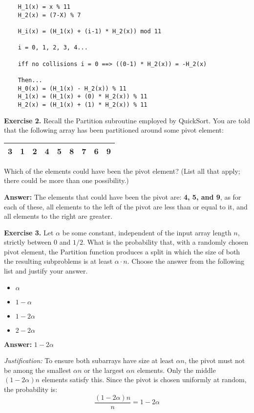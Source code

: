 \documentclass[11pt]{article}
\begin{document}
\bigskip
\begin{verbatim}
    H_1(x) = x % 11
    H_2(x) = (7-X) % 7
    
    H_i(x) = (H_1(x) + (i-1) * H_2(x)) mod 11
    
    i = 0, 1, 2, 3, 4... 
    
    iff no collisions i = 0 ==> ((0-1) * H_2(x)) = -H_2(x)
    
    Then... 
    H_0(x) = (H_1(x) - H_2(x)) % 11
    H_1(x) = (H_1(x) + (0) * H_2(x)) % 11
    H_2(x) = (H_1(x) + (1) * H_2(x)) % 11
\end{verbatim}





\textbf{Exercise 2.}  Recall the \textsf{Partition} subroutine employed by \textsf{QuickSort}. You are told that the following array has been partitioned around some pivot element:
\medskip

\begin{tabular}{|c|c|c|c|c|c|c|c|c|}
\hline 
3 & 1& 2 & 4 &5 &8 & 7 & 6 & 9 \\
\hline
\end{tabular}
\medskip

Which of the elements could have been the pivot element? (List all that apply; there could be more than one possibility.)
\medskip

\textbf{Answer:} The elements that could have been the pivot are: \textbf{4, 5, and 9}, as for each of these, all elements to the left of the pivot are less than or equal to it, and all elements to the right are greater.
\bigskip


\textbf{Exercise 3.}
Let $\alpha$ be some constant, independent of the input array length $n$, strictly between $0$ and $1/2$. What is the probability that, with a randomly chosen pivot element, the \textsf{Partition} function produces a split in which the size of both the resulting subproblems is at least $\alpha \cdot n$. Choose the answer from the following list and justify your answer.
\begin{itemize}
\item $\alpha$
\item $1 - \alpha$
\item $1-2\alpha$
\item $2 - 2 \alpha$
\end{itemize}
\medskip

\textbf{Answer:} $1 - 2\alpha$

\textit{Justification:} To ensure both subarrays have size at least $\alpha n$, the pivot must not be among the smallest $\alpha n$ or the largest $\alpha n$ elements. Only the middle $(1 - 2\alpha)n$ elements satisfy this. Since the pivot is chosen uniformly at random, the probability is:
\[
\frac{(1 - 2\alpha)n}{n} = 1 - 2\alpha
\]
\end{document}
